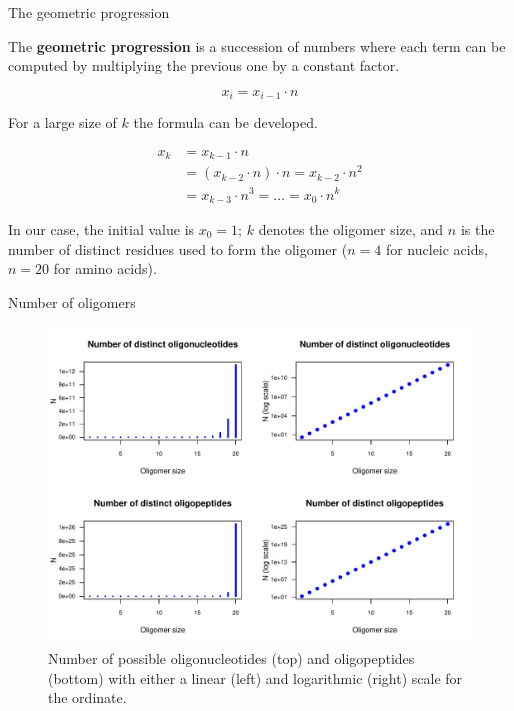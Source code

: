 \documentclass[ignorenonframetext,]{beamer}
\begin{document}
\begin{frame}{The geometric progression}
\protect\hypertarget{the-geometric-progression}{}

The \textbf{geometric progression} is a succession of numbers where each
term can be computed by multiplying the previous one by a constant
factor.

\[x_i = x_{i-1} \cdot n\]

For a large size of \(k\) the formula can be developed.

\[\begin{aligned}
x_k &=  x_{k-1} \cdot n \\
&=  (x_{k-2} \cdot n) \cdot n = x_{k-2} \cdot n^2 \\
&=  x_{k-3} \cdot n^3 = \ldots = x_0 \cdot n^k 
\end{aligned}\]

In our case, the initial value is \(x_0=1\); \(k\) denotes the oligomer
size, and \(n\) is the number of distinct residues used to form the
oligomer (\(n=4\) for nucleic acids, \(n=20\) for amino acids).

\end{frame}

\begin{frame}{Number of oligomers}
\protect\hypertarget{number-of-oligomers}{}

\begin{figure}

{\centering \includegraphics[width=0.6\linewidth]{figures/02_combinatorix_number_distinct_oligos-1} 

}

\caption{Number of possible oligonucleotides (top) and oligopeptides (bottom) with either a linear (left) and logarithmic (right) scale for the ordinate.}\label{fig:number_distinct_oligos}
\end{figure}

\end{frame}
\end{document}
